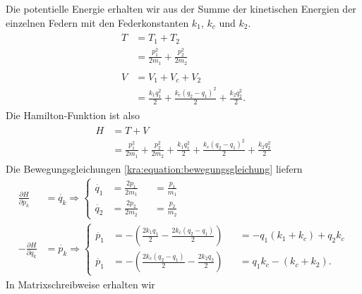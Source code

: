 Die potentielle Energie erhalten wir aus der Summe der kinetischen Energien der einzelnen Federn mit den Federkonstanten $k_1$, $k_c$ und $k_2$.
\begin{align*}
    \begin{split}
        T   &= T_1 + T_2 \\
        &= \frac{p_1^2}{2m_1} + \frac{p_2^2}{2m_2}
    \end{split}
    \\
    \begin{split}
        V   &= V_1 + V_c + V_2 \\
        &= \frac{k_1 q_1^2}{2} + \frac{k_c (q_2 - q_1)^2}{2} + \frac{k_2 q_2^2}{2}.
    \end{split}
\end{align*}
Die Hamilton-Funktion ist also
\begin{align*}
    \begin{split}
        H   &= T + V \\
        &= \frac{p_1^2}{2m_1} + \frac{p_2^2}{2m_2} + \frac{k_1 q_1^2}{2} + \frac{k_c (q_2 - q_1)^2}{2} + \frac{k_2 q_2^2}{2}
    \end{split}
\end{align*}
Die Bewegungsgleichungen \eqref{kra:equation:bewegungsgleichung} liefern
\begin{align*}
    \frac{\partial H}{\partial p_k}  & = \dot{q_k}
    \Rightarrow
    \left\{
    \begin{alignedat}{2}
        \dot{q_1}   &= \frac{2p_1}{2m_1}    &&= \frac{p_1}{m_1}\\
        \dot{q_2}   &= \frac{2p_2}{2m_2}    &&= \frac{p_2}{m_2}
    \end{alignedat}
    \right.
    \\
    -\frac{\partial H}{\partial q_k} & = \dot{p_k}
    \Rightarrow
    \left\{
    \begin{alignedat}{2}
        \dot{p_1}   &= -(\frac{2k_1q_1}{2} - \frac{2k_c(q_2-q_1)}{2})  &&= -q_1(k_1+k_c) + q_2k_c \\
        \dot{p_1}   &= -(\frac{2k_c(q_2-q_1)}{2} - \frac{2k_2q_2}{2})  &&= q_1k_c - (k_c + k_2).
    \end{alignedat}
    \right.
\end{align*}
In Matrixschreibweise erhalten wir
